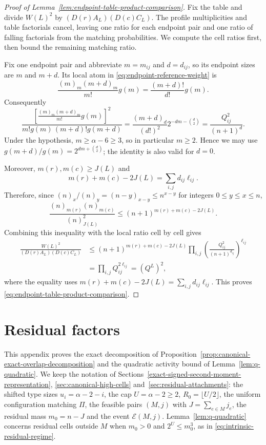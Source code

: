 \documentclass[a4paper,10pt,reqno]{amsart}
\numberwithin{equation}{section}
\theoremstyle{plain}
\theoremstyle{remark}
\begin{document}
\begin{proof}[Proof of Lemma~\ref{lem:endpoint-table-product-comparison}]
Fix the table and divide $W(L)^2$ by $(D(r)A_L)(D(c)C_L)$. The profile
multiplicities and table factorials cancel, leaving one ratio for each
endpoint pair and one ratio of falling factorials from the matching
probabilities. We compute the cell ratios first, then bound the remaining
matching ratio.

Fix one endpoint pair and abbreviate $m=m_{ij}$ and $d=d_{ij}$, so its
endpoint sizes are $m$ and $m+d$. Its local atom in
\eqref{eq:endpoint-reference-weight} is
\[
  \frac{(m)_m(m+d)_m}{m!}g(m)
  =
  \frac{(m+d)!}{d!}g(m).
\]
Consequently
\[
  \frac{
    \left[\frac{(m)_m(m+d)_m}{m!}g(m)\right]^2
  }{m!g(m)\,(m+d)!g(m+d)}
  =
  \frac{(m+d)_d}{(d!)^2}
  2^{-dm-\binom d2}
  =
  \frac{Q_{ij}^2}{(n+1)^d}.
\]
Under the hypothesis, $m\ge\alpha-6\ge3$, so in particular $m\ge2$. Hence we
may use $g(m+d)/g(m)=2^{dm+\binom d2}$; the identity is also valid for
$d=0$.

Moreover, $m(r),m(c)\ge J(L)$ and
\[
  m(r)+m(c)-2J(L)
  =
  \sum_{i,j}d_{ij}\ell_{ij}.
\]
Therefore, since $(n)_x/(n)_y=(n-y)_{x-y}\le n^{x-y}$ for integers
$0\le y\le x\le n$,
\[
  \frac{(n)_{m(r)}(n)_{m(c)}}{(n)_{J(L)}^2}
  \le
  (n+1)^{m(r)+m(c)-2J(L)}.
\]
Combining this inequality with the local ratio cell by cell gives
\[
\begin{aligned}
 \frac{W(L)^2}{(D(r)A_L)(D(c)C_L)}
 &\le
 (n+1)^{m(r)+m(c)-2J(L)}
 \prod_{i,j}
 \left(\frac{Q_{ij}^2}{(n+1)^{d_{ij}}}\right)^{\ell_{ij}}\\
 &=\prod_{i,j}Q_{ij}^{2\ell_{ij}}
  =(Q^L)^2,
\end{aligned}
\]
where the equality uses
\(m(r)+m(c)-2J(L)=\sum_{i,j}d_{ij}\ell_{ij}\). This proves
\eqref{eq:endpoint-table-product-comparison}.
\end{proof}

\section{Residual factors}
\label{app:residual-factors}

This appendix proves the exact decomposition of
Proposition~\ref{prop:canonical-exact-overlap-decomposition} and the
quadratic activity bound of Lemma~\ref{lem:q-quadratic}. We keep the
notation of Sections~\ref{exact-signed-second-moment-representation},
\ref{sec:canonical-high-cells} and~\ref{sec:residual-attachments}: the
shifted type sizes $u_i=\alpha-2-i$, the cap $U=\alpha-2\ge2$,
$R_0=\lfloor U/2\rfloor$, the uniform configuration matching $\Pi$, the
feasible pairs $(M,j)$ with $J=\sum_{e\in M}j_e$, the residual mass
$m_0=n-J$ and the event $\mathcal E(M,j)$. Lemma~\ref{lem:q-quadratic}
concerns residual cells outside $M$ when $m_0>0$ and $2^U\le m_0^3$, as in
\eqref{eq:intrinsic-residual-regime}.
\end{document}
